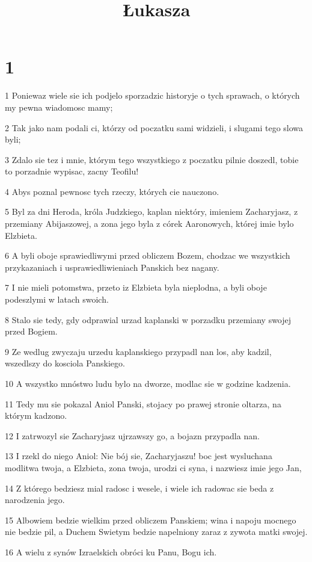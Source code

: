 

\title{Łukasza}


\chapter{1}

\par 1 Poniewaz wiele sie ich podjelo sporzadzic historyje o tych sprawach, o których my pewna wiadomosc mamy;
\par 2 Tak jako nam podali ci, którzy od poczatku sami widzieli, i slugami tego slowa byli;
\par 3 Zdalo sie tez i mnie, którym tego wszystkiego z poczatku pilnie doszedl, tobie to porzadnie wypisac, zacny Teofilu!
\par 4 Abys poznal pewnosc tych rzeczy, których cie nauczono.
\par 5 Byl za dni Heroda, króla Judzkiego, kaplan niektóry, imieniem Zacharyjasz, z przemiany Abijaszowej, a zona jego byla z córek Aaronowych, której imie bylo Elzbieta.
\par 6 A byli oboje sprawiedliwymi przed obliczem Bozem, chodzac we wszystkich przykazaniach i usprawiedliwieniach Panskich bez nagany.
\par 7 I nie mieli potomstwa, przeto iz Elzbieta byla nieplodna, a byli oboje podeszlymi w latach swoich.
\par 8 Stalo sie tedy, gdy odprawial urzad kaplanski w porzadku przemiany swojej przed Bogiem.
\par 9 Ze wedlug zwyczaju urzedu kaplanskiego przypadl nan los, aby kadzil, wszedlszy do kosciola Panskiego.
\par 10 A wszystko mnóstwo ludu bylo na dworze, modlac sie w godzine kadzenia.
\par 11 Tedy mu sie pokazal Aniol Panski, stojacy po prawej stronie oltarza, na którym kadzono.
\par 12 I zatrwozyl sie Zacharyjasz ujrzawszy go, a bojazn przypadla nan.
\par 13 I rzekl do niego Aniol: Nie bój sie, Zacharyjaszu! boc jest wysluchana modlitwa twoja, a Elzbieta, zona twoja, urodzi ci syna, i nazwiesz imie jego Jan,
\par 14 Z którego bedziesz mial radosc i wesele, i wiele ich radowac sie beda z narodzenia jego.
\par 15 Albowiem bedzie wielkim przed obliczem Panskiem; wina i napoju mocnego nie bedzie pil, a Duchem Swietym bedzie napelniony zaraz z zywota matki swojej.
\par 16 A wielu z synów Izraelskich obróci ku Panu, Bogu ich.
